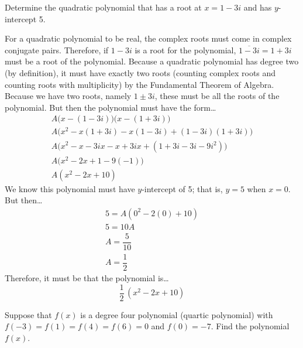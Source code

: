 \documentclass[11pt,letterpaper]{article}
\begin{document}
\newpage



 Determine the quadratic polynomial that has a root at $x= 1 - 3i$ and has $y$-intercept 5. \pspace

\sol For a quadratic polynomial to be real, the complex roots must come in complex conjugate pairs. Therefore, if $1 - 3i$ is a root for the polynomial, $\overline{1 - 3i}= 1 + 3i$ must be a root of the polynomial. Because a quadratic polynomial has degree two (by definition), it must have exactly two roots (counting complex roots and counting roots with multiplicity) by the Fundamental Theorem of Algebra. Because we have two roots, namely $1 \pm 3i$, these must be all the roots of the polynomial. But then the polynomial must have the form\dots
	\[
	\begin{gathered}
	A \big(x - (1 - 3i) \big) \big(x - (1 + 3i) \big) \\[0.3cm]
	A (x^2 - x(1 + 3i) - x(1 - 3i) + (1 - 3i)(1 + 3i) \big) \\[0.3cm]
	A \big(x^2 - x - 3ix - x + 3ix + (1 + 3i - 3i - 9i^2) \big) \\[0.3cm]
	A \big(x^2 - 2x + 1 - 9(-1) \big) \\[0.3cm]
	A(x^2 - 2x + 10) 
	\end{gathered}
	\]  \pspace
We know this polynomial must have $y$-intercept of 5; that is, $y= 5$ when $x= 0$. But then\dots
	\[
	\begin{gathered}
	5= A(0^2 - 2(0) + 10) \\[0.3cm]
	5= 10A \\[0.3cm]
	A= \dfrac{5}{10} \\[0.3cm]
	A= \dfrac{1}{2}
	\end{gathered}
	\] \pspace
Therefore, it must be that the polynomial is\dots
	\[
	\dfrac{1}{2}\, (x^2 - 2x + 10)
	\]



\newpage



 Suppose that $f(x)$ is a degree four polynomial (quartic polynomial) with $f(-3)= f(1)= f(4)= f(6)= 0$ and $f(0)= -7$. Find the polynomial $f(x)$. \pspace
\end{document}
